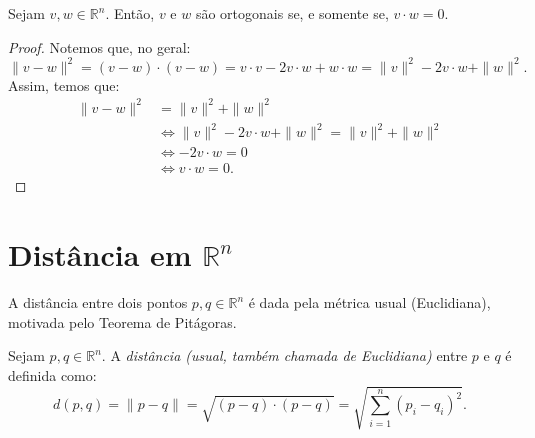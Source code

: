 \begin{proposition}
    Sejam $v, w \in \mathbb R^n$. Então, $v$ e $w$ são ortogonais se, e somente se, $v \cdot w = 0$.
\end{proposition}
\begin{proof}
    Notemos que, no geral:
    \begin{equation*}
        \|v-w\|^2 = (v-w) \cdot (v-w) = v \cdot v - 2v \cdot w + w \cdot w = \|v\|^2 - 2v \cdot w + \|w\|^2.
    \end{equation*}
    Assim, temos que:
    \begin{align*}
        \|v-w\|^2 &= \|v\|^2 + \|w\|^2 \\
        &\iff \|v\|^2 - 2v \cdot w + \|w\|^2 = \|v\|^2 + \|w\|^2 \\
        &\iff -2v \cdot w = 0 \\
        &\iff v \cdot w = 0.
    \end{align*}
\end{proof}
\section{Distância em $\mathbb R^n$}
A distância entre dois pontos $p, q \in \mathbb R^n$ é dada pela métrica usual (Euclidiana), motivada pelo Teorema de Pitágoras.

\begin{definition}
    Sejam $p, q \in \mathbb R^n$. A \emph{distância (usual, também chamada de Euclidiana)} entre $p$ e $q$ é definida como:
    \begin{equation*}
        d(p, q) = \|p-q\| = \sqrt{(p-q) \cdot (p-q)}=\sqrt{\sum_{i=1}^n (p_i - q_i)^2}.
    \end{equation*}
\end{definition}

